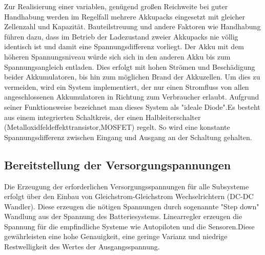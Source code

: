 Zur Realisierung einer variablen, genügend großen Reichweite bei guter Handhabung werden im Regelfall mehrere Akkupacks eingesetzt mit gleicher Zellenzahl und Kapazität.
Bauteilstreuung und andere Faktoren wie Handhabung führen dazu, dass im Betrieb  der Ladezustand zweier Akkupacks nie völlig identisch ist und damit eine Spannungsdifferenz vorliegt. Der Akku mit dem höheren Spannungsniveau würde sich sich in den anderen Akku bis zum Spannungsangleich entladen. Dies erfolgt mit hohen Strömen und Beschädigung beider Akkumulatoren, bis hin zum möglichen Brand der Akkuzellen.
Um dies zu vermeiden, wird ein System implementiert, der nur einen Stromfluss von allen angeschlossenen Akkumulatoren in Richtung zum Verbraucher erlaubt. Aufgrund seiner Funktionsweise bezeichnet man dieses System als "ideale Diode".Es besteht aus einem integrierten Schaltkreis, der einen Halbleiterschalter (Metalloxidfeldeffekttransistor,MOSFET) regelt. So wird eine konstante Spannungsdifferenz zwischen Eingang und Ausgang an der Schaltung gehalten.


\begin{comment}
Zur Realisierung einer variablen großen Reichweite bei guter Handhabung werden im Regelfall mehrere Akkupacks gleicher Zellenzahl und Kapazität eingesetzt.
In der Praxis ist es unvermeidlich, dass der Ladezustand zweier Akkupacks aufgrund von Bauteilstreuung und Handhabung nie identisch ist und damit eine Spannungsdifferenz aufweist. Damit würde der Akku mit dem höheren Spannungsniveau sich über eine niederohmige Verbindung ungebremst in den zweiten Akku bis zum Spannungsangleich entladen. Dies erfolgt mit  hohen Strömen und Beschädigung beider Akkumulatoren bis hin zum möglichen Brand der Akkuzellen.
Um zu vermeiden, dass dieser Ausgleich stattfindet, wird ein System implementiert, welches nur einen Stromfluss von allen angeschlossenen Akkumulatoren in Richtung der Verbraucher ermöglicht.
Dieses System wird aufgrund seiner Funktionsweise als "ideale Diode" bezeichnet. Es besteht aus einem integrierten Schaltkreis welches einen Halbleiterschalter (Metalloxidfeldeffekttransistor kurz MOSFET) regelt um einen konstante Spannungsdifferenz zwischen Eingang und Ausgang dieser Schaltung zu halten.
\end{comment}


\subsection{Bereitstellung der Versorgungspannungen}

Die Erzeugung der erforderlichen Versorgungsspannungen für alle Subsysteme erfolgt über den Einbau von Gleichstrom-Gleichstrom Wechselrichtern (DC-DC Wandler).
Diese erzeugen die nötigen Spannungen durch sogenannte "Step down"  Wandlung aus der Spannung des Batteriesystems.
Linearregler erzeugen die Spannung für die empfindliche Systeme wie Autopiloten und die Sensoren.Diese gewährleisten eine hohe Genauigkeit, eine geringe Varianz und niedrige Restwelligkeit des Wertes der Ausgangsspannung.

